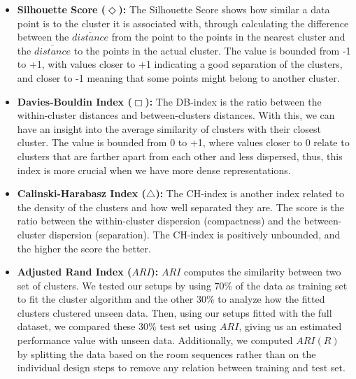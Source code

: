 \begin{itemize}
\item \textbf{Silhouette Score ($\Diamond$):} The Silhouette Score shows how similar a data point is to the cluster it is associated with, through calculating the difference between the $\overline{distance}$ from the point to the points in the nearest cluster and the $\overline{distance}$ to the points in the actual cluster. The value is bounded from -1 to +1, with values closer to +1 indicating a good separation of the clusters, and closer to -1 meaning that some points might belong to another cluster.
\item \textbf{Davies-Bouldin Index ($\Box$):} The DB-index is the ratio between the within-cluster distances and between-clusters distances. With this, we can have an insight into the average similarity of clusters with their closest cluster. The value is bounded from 0 to +1, where values closer to 0 relate to clusters that are farther apart from each other and less dispersed, thus, this index is more crucial when we have more dense representations.
\item \textbf{Calinski-Harabasz Index ($\bigtriangleup$):} The CH-index is another index related to the density of the clusters and how well separated they are. The score is the ratio between the within-cluster dispersion (compactness) and the between-cluster dispersion (separation). The CH-index is positively unbounded, and the higher the score the better.
\item \textbf{Adjusted Rand Index ($ARI$):} $ARI$ computes the similarity between two set of clusters. We tested our setups by using 70\% of the data as training set to fit the cluster algorithm and the other 30\% to analyze how the fitted clusters clustered unseen data. Then, using our setups fitted with the full dataset, we compared these 30\% test set using $ARI$, giving us an estimated performance value with unseen data. Additionally, we computed $ARI(R)$ by splitting the data based on the room sequences rather than on the individual design steps to remove any relation between training and test set.


\end{itemize}



